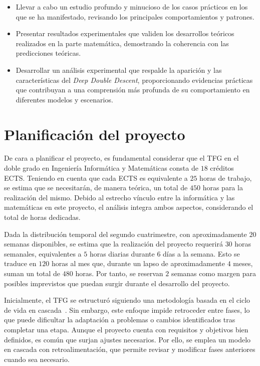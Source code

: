 \begin{itemize}
    \item Llevar a cabo un estudio profundo y minucioso de los casos prácticos en los que se ha manifestado, revisando los principales comportamientos y patrones.
    \item Presentar resultados experimentales que validen los desarrollos teóricos realizados en la parte matemática, demostrando la coherencia con las predicciones teóricas.
    \item Desarrollar un análisis experimental que respalde la aparición y las características del \textit{Deep Double Descent}, proporcionando evidencias prácticas que contribuyan a una comprensión más profunda de su comportamiento en diferentes modelos y escenarios.
\end{itemize}

\section{Planificación del proyecto}

De cara a planificar el proyecto, es fundamental considerar que el TFG en el doble grado en Ingeniería Informática y Matemáticas consta de $18$ créditos ECTS. Teniendo en cuenta que cada ECTS es equivalente a $25$ horas de trabajo, se estima que se necesitarán, de manera teórica, un total de $450$ horas para la realización del mismo. Debido al estrecho vínculo entre la informática y las matemáticas en este proyecto, el análisis integra ambos aspectos, considerando el total de horas dedicadas.

Dada la distribución temporal del segundo cuatrimestre, con aproximadamente $20$ semanas disponibles, se estima que la realización del proyecto requerirá $30$ horas semanales, equivalentes a $5$ horas diarias durante $6$ días a la semana. Esto se traduce en $120$ horas al mes que, durante un lapso de aproximadamente $4$ meses, suman un total de $480$ horas. Por tanto, se reservan $2$ semanas como margen para posibles imprevistos que puedan surgir durante el desarrollo del proyecto.

Inicialmente, el TFG se estructuró siguiendo una metodología basada en el ciclo de vida en cascada~\cite{Pressman1994}. Sin embargo, este enfoque impide retroceder entre fases, lo que puede dificultar la adaptación a problemas o cambios identificados tras completar una etapa. Aunque el proyecto cuenta con requisitos y objetivos bien definidos, es común que surjan ajustes necesarios. Por ello, se emplea un modelo en cascada con retroalimentación, que permite revisar y modificar fases anteriores cuando sea necesario.

